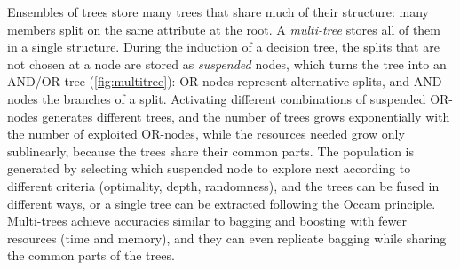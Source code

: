 Ensembles of trees store many trees that share much of their structure: many members split on
the same attribute at the root. A \emph{multi-tree} \citep{estruch2002shared} stores all of them
in a single structure. During the induction of a decision tree, the splits that are not chosen
at a node are stored as \emph{suspended} nodes, which turns the tree into an
AND/OR tree (\cref{fig:multitree}): OR-nodes represent alternative splits, and AND-nodes the
branches of a split. Activating different combinations of suspended OR-nodes generates
different trees, and the number of trees grows exponentially with the number of exploited
OR-nodes, while the resources needed grow only sublinearly, because the trees share their
common parts. The population is generated by selecting which suspended node to explore next
according to different criteria (optimality, depth, randomness), and the trees can be fused in
different ways, or a single tree can be extracted following the Occam principle. Multi-trees
achieve accuracies similar to bagging and boosting with fewer resources (time and memory), and
they can even replicate bagging while sharing the common parts of the trees.

